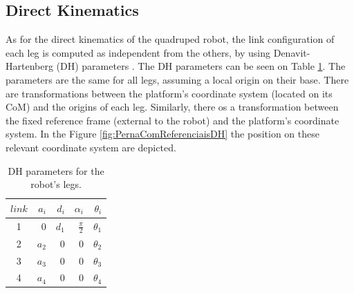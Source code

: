 \subsection{Direct Kinematics}\label{subsectionFK}
As for the direct kinematics of the quadruped robot, the link configuration of each leg is computed as independent from the others, by using Denavit-Hartenberg (DH) parameters \cite{bento_filho_modeling_2007}. The DH parameters can be seen on Table \ref{tab:01}. The parameters are the same for all legs, assuming a local origin on their base.  There are transformations between the platform's coordinate system (located on its CoM) and the origins of each leg. Similarly, there os a transformation between the fixed reference frame (external to the robot) and the platform's coordinate system. In the Figure \ref{fig:PernaComReferenciaisDH} the position on these relevant coordinate system are depicted. 
\begin{table}[h]
	\caption{DH parameters \cite{spong_robot_2006} for the robot's legs.} %
	\begin{center}
		\begin{tabular}{crrrr}
			\label{tab:01}
			$link$ 	& $a_i$		& $d_i$		& $\alpha_i$ 		& $\theta_i$ \\ \hline
			1    	& 0			& $d_1$ 	& $\frac{\pi}{2}$ 	& $\theta_1$ \\
			2    	& $a_2$ 	& 0 		& 0 				& $\theta_2$ \\
			3    	& $a_3$ 	& 0 		& 0 				& $\theta_3$ \\
			4    	& $a_4$ 	& 0 		& 0 				& $\theta_4$ \\ \hline
		\end{tabular}		
	\end{center}
\end{table}
